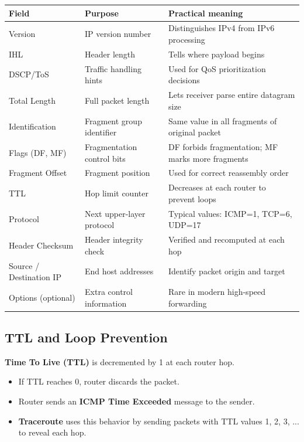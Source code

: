 \documentclass[12pt,a4paper]{article}
\begin{document}
\begin{center}
\begin{tabular}{|l|p{4.2cm}|p{5.5cm}|}
    \hline
    \textbf{Field} & \textbf{Purpose} & \textbf{Practical meaning} \\
    \hline
    Version & IP version number & Distinguishes IPv4 from IPv6 processing \\
    \hline
    IHL & Header length & Tells where payload begins \\
    \hline
    DSCP/ToS & Traffic handling hints & Used for QoS prioritization decisions \\
    \hline
    Total Length & Full packet length & Lets receiver parse entire datagram size \\
    \hline
    Identification & Fragment group identifier & Same value in all fragments of original packet \\
    \hline
    Flags (DF, MF) & Fragmentation control bits & DF forbids fragmentation; MF marks more fragments \\
    \hline
    Fragment Offset & Fragment position & Used for correct reassembly order \\
    \hline
    TTL & Hop limit counter & Decreases at each router to prevent loops \\
    \hline
    Protocol & Next upper-layer protocol & Typical values: ICMP=1, TCP=6, UDP=17 \\
    \hline
    Header Checksum & Header integrity check & Verified and recomputed at each hop \\
    \hline
    Source / Destination IP & End host addresses & Identify packet origin and target \\
    \hline
    Options (optional) & Extra control information & Rare in modern high-speed forwarding \\
    \hline
\end{tabular}
\end{center}

\subsection*{TTL and Loop Prevention}
\textbf{Time To Live (TTL)} is decremented by 1 at each router hop.
\begin{itemize}
    \item If TTL reaches 0, router discards the packet.
    \item Router sends an \textbf{ICMP Time Exceeded} message to the sender.
    \item \textbf{Traceroute} uses this behavior by sending packets with TTL values 1, 2, 3, ... to reveal each hop.
\end{itemize}
\end{document}
